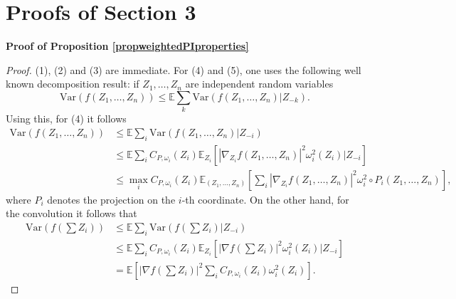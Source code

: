 \documentclass[11pt,reqno]{amsart}
\numberwithin{equation}{section}
\theoremstyle{definition}
\theoremstyle{remark}
\def \Var {\textrm{Var}}
\begin{document}
\newpage
\section{Proofs of Section 3}\label{appendix_section_3}
\noindent \textbf{Proof of Proposition \ref{propweightedPIproperties}}
\begin{proof}
    (1), (2) and (3) are immediate. For (4) and (5), one uses the following well known decomposition  result: if $Z_1, \dots, Z_n$ are independent random variables
    \begin{equation}\label{eq:subadditivity_variance}
        \Var(f(Z_1, \dots, Z_n))\leq \mathbb{E}\sum_k\Var(f(Z_1, \dots, Z_n)\vert Z_{-k}).
    \end{equation}
Using this, for (4) it follows
\begin{align*}
    \Var\left(f\left(Z_1, \dots, Z_n\right)\right)&\leq \mathbb{E}\sum_i\Var\left(f\left(Z_1, \dots, Z_n\right)\vert Z_{-i}\right)\\
    &\leq \mathbb{E}\sum_i C_{P, \omega_i}(Z_i)\mathbb{E}_{Z_i}\left[\left\vert \nabla_{Z_i} f\left( Z_1, \dots, Z_n\right)\right\vert^2\omega_i^2(Z_i)\Big\vert Z_{-i}\right]\\
    &\leq \max_iC_{P,\omega_i}(Z_i)\mathbb{E}_{( Z_1, \dots, Z_n)}\left[\sum_i\left\vert \nabla_{Z_i} f\left( Z_1,\dots, Z_n\right)\right\vert^2\omega_i^2\circ P_i(Z_1, \dots, Z_n)\right],
\end{align*}
where $P_i$ denotes the projection on the $i$-th coordinate.
On the other hand, for the convolution it follows that
\begin{align*}
    \Var\left(f\left(\sum Z_i\right)\right)&\leq \mathbb{E}\sum_i\Var\left(f\left(\sum Z_i\right)\vert Z_{-i}\right)\\
    &\leq \mathbb{E}\sum_i C_{P, \omega_i}(Z_i)\mathbb{E}_{Z_i}\left[\left\vert \nabla f\left(\sum Z_i\right)\right\vert^2\omega_i^2(Z_i)\vert Z_{-i}\right] \\
    &=\mathbb{E}\left[\left\vert \nabla f\left(\sum Z_i\right)\right\vert^2\sum_{i} C_{P, \omega_i}(Z_i)\omega_i^2(Z_i)\right] .
\end{align*}
\end{proof}
\end{document}
